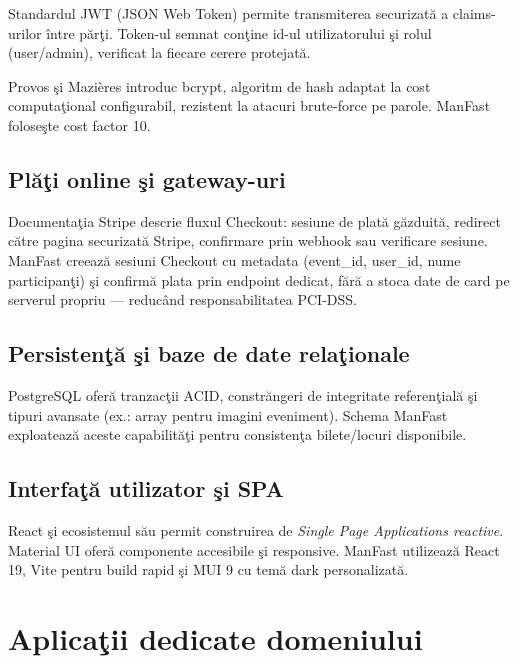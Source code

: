 Standardul JWT (JSON Web Token) \cite{jwt2015} permite transmiterea securizat\u a a claims-urilor \^intre p\u ar\c ti. Token-ul semnat con\c tine id-ul utilizatorului \c si rolul (user/admin), verificat la fiecare cerere protejat\u a.

Provos \c si Mazi\`eres \cite{bcrypt1999} introduc bcrypt, algoritm de hash adaptat la cost computa\c tional configurabil, rezistent la atacuri brute-force pe parole. ManFast folose\c ste cost factor 10.

\subsection{Pl\u a\c ti online \c si gateway-uri}

Documenta\c tia Stripe \cite{stripe2024} descrie fluxul Checkout: sesiune de plat\u a g\u azduit\u a, redirect c\u atre pagina securizat\u a Stripe, confirmare prin webhook sau verificare sesiune. ManFast creeaz\u a sesiuni Checkout cu metadata (event\_id, user\_id, nume participan\c ti) \c si confirm\u a plata prin endpoint dedicat, f\u ar\u a a stoca date de card pe serverul propriu --- reduc\^and responsabilitatea PCI-DSS.

\subsection{Persisten\c t\u a \c si baze de date rela\c tionale}

PostgreSQL \cite{postgresql2024} ofer\u a tranzac\c tii ACID, constr\u angeri de integritate referen\c tial\u a \c si tipuri \linebreak avansate (ex.: array pentru imagini eveniment). Schema ManFast exploateaz\u a aceste capabilit\u a\c ti pentru consisten\c ta bilete/locuri disponibile.

\subsection{Interfa\c t\u a utilizator \c si SPA}

React \cite{react2024} \c si ecosistemul s\u au permit construirea de \textit{Single Page Applications reactive}. Material UI \cite{mui2024} ofer\u a componente accesibile \c si responsive. ManFast utilizeaz\u a React 19, Vite pentru build rapid \c si MUI 9 cu tem\u a dark personalizat\u a.

\section{Aplica\c tii dedicate domeniului}

